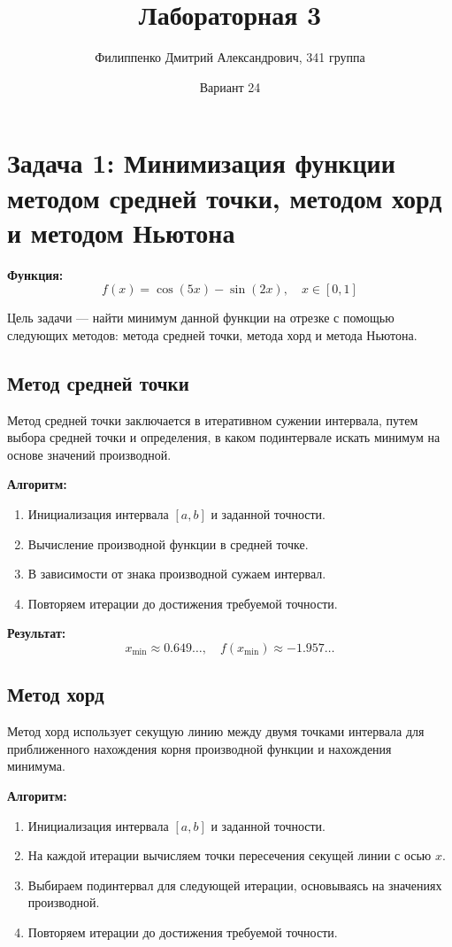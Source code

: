 \documentclass[a4paper,12pt]{article}
\title{Лабораторная 3}
\author{Филиппенко Дмитрий Александрович, 341 группа}
\date{Вариант 24}
\begin{document}
\maketitle

\section{Задача 1: Минимизация функции методом средней точки, методом хорд и методом Ньютона}

\textbf{Функция:}
\[
f(x) = \cos(5x) - \sin(2x), \quad x \in [0, 1]
\]

Цель задачи — найти минимум данной функции на отрезке с помощью следующих методов: метода средней точки, метода хорд и метода Ньютона.

\subsection{Метод средней точки}

Метод средней точки заключается в итеративном сужении интервала, путем выбора средней точки и определения, в каком подинтервале искать минимум на основе значений производной.

\textbf{Алгоритм:}
\begin{enumerate}
    \item Инициализация интервала \( [a, b] \) и заданной точности.
    \item Вычисление производной функции в средней точке.
    \item В зависимости от знака производной сужаем интервал.
    \item Повторяем итерации до достижения требуемой точности.
\end{enumerate}

\textbf{Результат:}
\[ x_{\text{min}} \approx 0.649 \ldots, \quad f(x_{\text{min}}) \approx -1.957 \ldots \]

\subsection{Метод хорд}

Метод хорд использует секущую линию между двумя точками интервала для приближенного нахождения корня производной функции и нахождения минимума.

\textbf{Алгоритм:}
\begin{enumerate}
    \item Инициализация интервала \( [a, b] \) и заданной точности.
    \item На каждой итерации вычисляем точки пересечения секущей линии с осью \( x \).
    \item Выбираем подинтервал для следующей итерации, основываясь на значениях производной.
    \item Повторяем итерации до достижения требуемой точности.
\end{enumerate}
\end{document}
